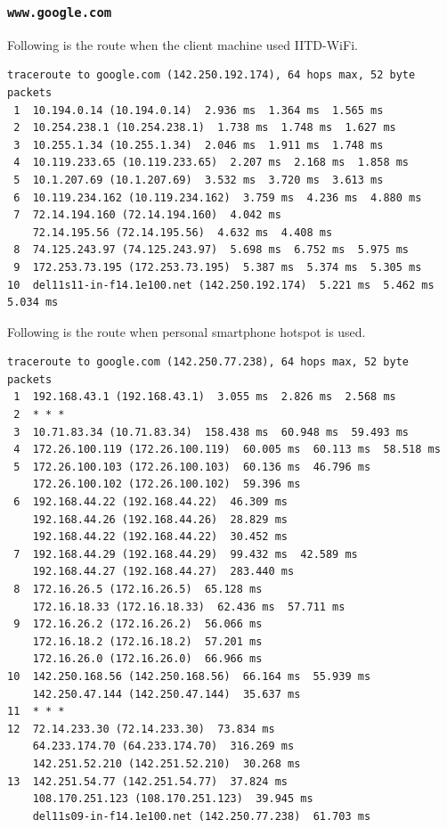\documentclass[a4paper]{article}
\begin{document}
\subsubsection{\texttt{www.google.com}}
Following is the route when the client machine used IITD-WiFi. \\
\begin{lstlisting}
traceroute to google.com (142.250.192.174), 64 hops max, 52 byte packets
 1  10.194.0.14 (10.194.0.14)  2.936 ms  1.364 ms  1.565 ms
 2  10.254.238.1 (10.254.238.1)  1.738 ms  1.748 ms  1.627 ms
 3  10.255.1.34 (10.255.1.34)  2.046 ms  1.911 ms  1.748 ms
 4  10.119.233.65 (10.119.233.65)  2.207 ms  2.168 ms  1.858 ms
 5  10.1.207.69 (10.1.207.69)  3.532 ms  3.720 ms  3.613 ms
 6  10.119.234.162 (10.119.234.162)  3.759 ms  4.236 ms  4.880 ms
 7  72.14.194.160 (72.14.194.160)  4.042 ms
    72.14.195.56 (72.14.195.56)  4.632 ms  4.408 ms
 8  74.125.243.97 (74.125.243.97)  5.698 ms  6.752 ms  5.975 ms
 9  172.253.73.195 (172.253.73.195)  5.387 ms  5.374 ms  5.305 ms
10  del11s11-in-f14.1e100.net (142.250.192.174)  5.221 ms  5.462 ms  5.034 ms
\end{lstlisting}

Following is the route when personal smartphone hotspot is used. \\
\begin{lstlisting}
traceroute to google.com (142.250.77.238), 64 hops max, 52 byte packets
 1  192.168.43.1 (192.168.43.1)  3.055 ms  2.826 ms  2.568 ms
 2  * * *
 3  10.71.83.34 (10.71.83.34)  158.438 ms  60.948 ms  59.493 ms
 4  172.26.100.119 (172.26.100.119)  60.005 ms  60.113 ms  58.518 ms
 5  172.26.100.103 (172.26.100.103)  60.136 ms  46.796 ms
    172.26.100.102 (172.26.100.102)  59.396 ms
 6  192.168.44.22 (192.168.44.22)  46.309 ms
    192.168.44.26 (192.168.44.26)  28.829 ms
    192.168.44.22 (192.168.44.22)  30.452 ms
 7  192.168.44.29 (192.168.44.29)  99.432 ms  42.589 ms
    192.168.44.27 (192.168.44.27)  283.440 ms
 8  172.16.26.5 (172.16.26.5)  65.128 ms
    172.16.18.33 (172.16.18.33)  62.436 ms  57.711 ms
 9  172.16.26.2 (172.16.26.2)  56.066 ms
    172.16.18.2 (172.16.18.2)  57.201 ms
    172.16.26.0 (172.16.26.0)  66.966 ms
10  142.250.168.56 (142.250.168.56)  66.164 ms  55.939 ms
    142.250.47.144 (142.250.47.144)  35.637 ms
11  * * *
12  72.14.233.30 (72.14.233.30)  73.834 ms
    64.233.174.70 (64.233.174.70)  316.269 ms
    142.251.52.210 (142.251.52.210)  30.268 ms
13  142.251.54.77 (142.251.54.77)  37.824 ms
    108.170.251.123 (108.170.251.123)  39.945 ms
    del11s09-in-f14.1e100.net (142.250.77.238)  61.703 ms
\end{lstlisting}
\end{document}
